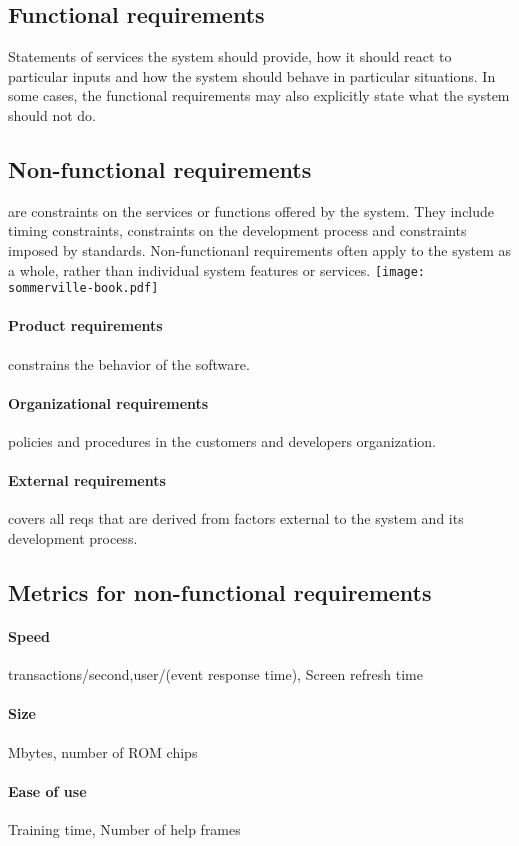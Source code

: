 \documentclass[a4paper,11pt,twocolumn]{report}
\begin{document}
    \subsection{Functional requirements}
    Statements of services the system should provide, how it should react to
    particular inputs and how the system should behave in particular
    situations. In some cases, the functional requirements may also explicitly
    state what the system should not do.
    \subsection{Non-functional requirements}
    are constraints on the services or functions offered by the system. They
    include timing constraints, constraints on the development process and
    constraints imposed by standards. Non-functionanl requirements often apply
    to the system as a whole, rather than individual system features or
    services.
    \texttt{[image: sommerville-book.pdf]}
    \paragraph{Product requirements} constrains the behavior of the software.
    \paragraph{Organizational requirements} policies and procedures in the
    customers and developers organization.
    \paragraph{External requirements} covers all reqs that are derived from
    factors external to the system and its development process. 
    \subsection{Metrics for non-functional requirements}
    \paragraph{Speed} transactions/second,user/(event response time), Screen
    refresh time
    \paragraph{Size} Mbytes, number of ROM chips
    \paragraph{Ease of use} Training time, Number of help frames
\end{document}
